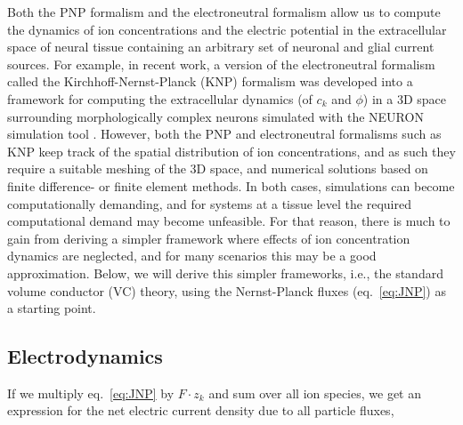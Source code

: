 \documentclass[preprint,11pt,authoryear]{elsarticle}
\begin{document}
Both the PNP formalism and the electroneutral formalism allow us to compute the dynamics of ion concentrations and the electric potential in the extracellular space of neural tissue containing an arbitrary set of neuronal and glial current sources. For example, in recent work, a version of the electroneutral formalism called the Kirchhoff-Nernst-Planck (KNP) formalism was developed into a framework for computing the extracellular dynamics (of $c_k$ and $\phi$) in a 3D space surrounding morphologically complex neurons simulated with the NEURON simulation tool \citep{Solbra2018}. However, both the PNP and electroneutral formalisms such as KNP keep track of the spatial distribution of ion concentrations, and as such they require a suitable meshing of the 3D space, and numerical solutions based on finite difference- or finite element methods. In both cases, simulations can become computationally demanding, and for systems at a tissue level the required computational demand may become unfeasible. For that reason, there is much to gain from deriving a simpler framework where effects of ion concentration dynamics are neglected, and for many scenarios this may be a good approximation. Below, we will derive this simpler frameworks, i.e., the standard volume conductor (VC) theory, using the Nernst-Planck fluxes (eq.~\ref{eq:JNP}) as a starting point.

\subsection{Electrodynamics}
If we multiply eq.~\ref{eq:JNP} by $F\cdot z_k$ and sum over all ion species, we get an expression for the net electric current density due to all particle fluxes,
\end{document}
